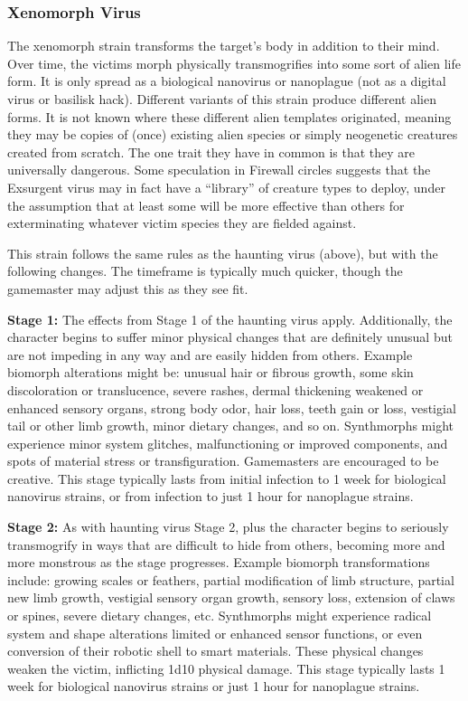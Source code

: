 \subsubsection{Xenomorph Virus}

The xenomorph strain transforms the target's body 
in addition to their mind. Over time, the victims 
morph physically transmogrifies into some sort 
of alien life form. It is only spread as a biological 
nanovirus or nanoplague (not as a digital virus or 
basilisk hack). Different variants of this strain produce
different alien forms. It is not known where
these different alien templates originated, meaning 
they may be copies of (once) existing alien species 
or simply neogenetic creatures created from scratch. 
The one trait they have in common is that they are 
universally dangerous. Some speculation in Firewall 
circles suggests that the Exsurgent virus may in fact 
have a ``library'' of creature types to deploy, under 
the assumption that at least some will be more effective
than others for exterminating whatever victim
species they are fielded against. 

This strain follows the same rules as the haunting 
virus (above), but with the following changes. The 
timeframe is typically much quicker, though the gamemaster
may adjust this as they see fit.

\textbf{Stage 1:} The effects from Stage 1 of the haunting 
virus apply. Additionally, the character begins to suffer 
minor physical changes that are definitely unusual but 
are not impeding in any way and are easily hidden 
from others. Example biomorph alterations might be: 
unusual hair or fibrous growth, some skin discoloration
or translucence, severe rashes, dermal thickening
weakened or enhanced sensory organs, strong
body odor, hair loss, teeth gain or loss, vestigial tail or 
other limb growth, minor dietary changes, and so on. 
Synthmorphs might experience minor system glitches, 
malfunctioning or improved components, and spots 
of material stress or transfiguration.  Gamemasters 
are encouraged to be creative. This stage typically 
lasts from initial infection to 1 week for biological 
nanovirus strains, or from infection to just 1 hour for 
nanoplague strains.

\textbf{Stage 2:} As with haunting virus Stage 2, plus the 
character begins to seriously transmogrify in ways 
that are difficult to hide from others, becoming 
more and more monstrous as the stage progresses. 
Example biomorph transformations include: growing
scales or feathers, partial modification of limb
structure, partial new limb growth, vestigial sensory 
organ growth, sensory loss, extension of claws or 
spines, severe dietary changes, etc. Synthmorphs 
might experience radical system and shape alterations
limited or enhanced sensor functions, or even
conversion of their robotic shell to smart materials. 
These physical changes weaken the victim, inflicting 
1d10 physical damage. This stage typically lasts 1 
week for biological nanovirus strains or just 1 hour 
for nanoplague strains.

